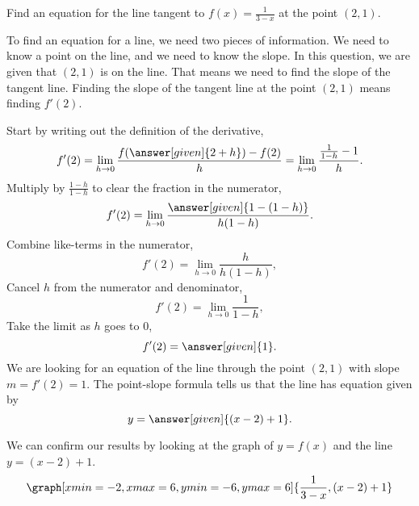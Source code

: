 \documentclass{ximera}
\begin{document}
\begin{example}
  Find an equation for the line tangent to $f(x) = \frac{1}{3-x}$ at the point $(2, 1)$.
  \begin{explanation}
    To find an equation for a line, we need two pieces of information.  We need to know
    a point on the line, and we need to know the slope.  In this question, we are given
    that $(2,1)$ is on the line.  That means we need to find the slope of the tangent line.
    Finding the slope of the tangent line at the point $(2,1)$ means finding $f'(2)$.
    
    Start by writing out the definition of the derivative,
    \[
    f'(2) = \lim_{h\to 0} \frac{f(\answer[given]{2+h})-f(2)}{h} = \lim_{h\to 0} \frac{\frac{1}{1-h} - 1}{h}.
    \]
    Multiply by $\frac{1-h}{1-h}$ to clear the fraction in the numerator,
    \[
    f'(2) = \lim_{h\to 0} \frac{\answer[given]{1 - (1-h)}}{h(1-h)}.
    \]
    Combine like-terms in the numerator,
    \[
    f'(2) = \lim_{h\to 0} \frac{h}{h(1-h)},
    \]
    Cancel $h$ from the numerator and denominator,
    \[
    f'(2) = \lim_{h\to 0} \frac{1}{1-h},
    \]		
    Take the limit as $h$ goes to $0$,
    \[
    f'(2) = \answer[given]{1}.
    \]
    We are looking for an equation of the line through the point
    $(2,1)$ with slope $m = f'(2) = 1$.  The point-slope formula tells
    us that the line has equation given by
    \[
    y= \answer[given]{(x-2) + 1}.
    \]
  \begin{onlineOnly}
  We can confirm our results by looking at the graph of $y=f(x)$ and the line $y=(x-2)+1$. 
  \[
  \graph[xmin=-2,xmax=6,ymin=-6,ymax=6]{\frac{1}{3-x}, (x-2)+1}
  \]
  \end{onlineOnly}
  \end{explanation}
\end{example}
\end{document}
